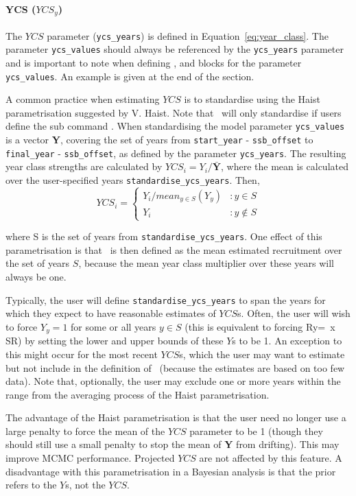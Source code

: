 \paragraph*{YCS ($YCS_y$)}
The $YCS$ parameter (\texttt{ycs\_years})  is defined in Equation~\eqref{eq:year_class}. The parameter \texttt{ycs\_values} should always be referenced by the \texttt{ycs\_years} parameter and is important to note when defining ,  and  blocks for the parameter \texttt{ycs\_values}. An example is given at the end of the section.

A common practice when estimating $YCS$ is to standardise using the Haist parametrisation suggested by V. Haist. Note that \CNAME\ will only standardise if users define the sub command . When standardising the model parameter \texttt{ycs\_values} is a vector \textbf{Y}, covering the set of years from \texttt{start\_year} - \texttt{ssb\_offset} to \texttt{final\_year} - \texttt{ssb\_offset}, as defined by the parameter \texttt{ycs\_years}. The resulting year class strengths are calculated by $YCS_i=Y_i/\bar{\textbf{Y}}$, where the mean is calculated over the user-specified years \texttt{standardise\_ycs\_years}. Then,
\[
YCS_i =
\begin{cases}
Y_i / mean_{y \in S}(Y_y) & :y \in S\\
Y_i					 & :y \notin S
\end{cases}
\]

where S is the set of years from \texttt{standardise\_ycs\_years}. One effect of this parametrisation is that \Rzero\ is then defined as the mean estimated recruitment over the set of years $S$, because the mean year class multiplier over these years will always be one.

Typically, the user will define \texttt{standardise\_ycs\_years} to span the years for which they expect to have reasonable estimates of $YCS$s. Often, the user will wish to force $Y_y=1$ for some or all years $y\in S$ (this is equivalent to forcing Ry=\Rzero\ x SR) by setting the lower and upper bounds of these $Y$s to be 1. An exception to this might occur for the most recent $YCS$s, which the user may want to estimate but not include in the definition of \Rzero\ (because the estimates are based on too few data). Note that, optionally, the user may exclude one or more years within the range from the averaging process of the Haist parametrisation.

The advantage of the Haist parametrisation is that the user need no longer use a large penalty to force the mean of the $YCS$ parameter to be 1 (though they should still use a small penalty to stop the mean of \textbf{Y} from drifting). This may improve MCMC performance.  Projected $YCS$ are not affected by this feature. A disadvantage with this parametrisation in a Bayesian analysis is that the prior refers to the $Y$s, not the $YCS$.


